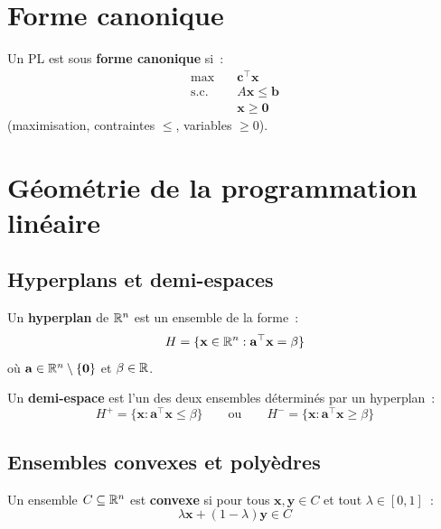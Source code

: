 \section{Forme canonique}

\begin{definition}
Un PL est sous \textbf{forme canonique} si~:
\[
\begin{aligned}
  \max \quad & \mathbf{c}^\top \mathbf{x} \\
  \text{s.c.} \quad
    & A\mathbf{x} \le \mathbf{b} \\
    & \mathbf{x} \ge \mathbf{0}
\end{aligned}
\]
(maximisation, contraintes $\le$, variables $\ge 0$).
\end{definition}

\section{G\'eom\'etrie de la programmation lin\'eaire}

\subsection{Hyperplans et demi-espaces}

\begin{definition}[Hyperplan]
Un \textbf{hyperplan} de $\mathbb{R}^n$ est un ensemble de la forme~:
\[
  H = \{\mathbf{x} \in \mathbb{R}^n : \mathbf{a}^\top \mathbf{x} = \beta\}
\]
o\`u $\mathbf{a} \in \mathbb{R}^n \setminus \{\mathbf{0}\}$ et $\beta \in \mathbb{R}$.
\end{definition}

\begin{definition}
Un \textbf{demi-espace} est l'un des deux ensembles d\'etermin\'es par un
hyperplan~:
\[
  H^+ = \{\mathbf{x} : \mathbf{a}^\top \mathbf{x} \le \beta\}
  \qquad \text{ou} \qquad
  H^- = \{\mathbf{x} : \mathbf{a}^\top \mathbf{x} \ge \beta\}
\]
\end{definition}

\subsection{Ensembles convexes et poly\`edres}

\begin{definition}
Un ensemble $C \subseteq \mathbb{R}^n$ est \textbf{convexe} si pour tous
$\mathbf{x}, \mathbf{y} \in C$ et tout $\lambda \in [0,1]$~:
\[
  \lambda \mathbf{x} + (1-\lambda)\mathbf{y} \in C
\]
\end{definition}

